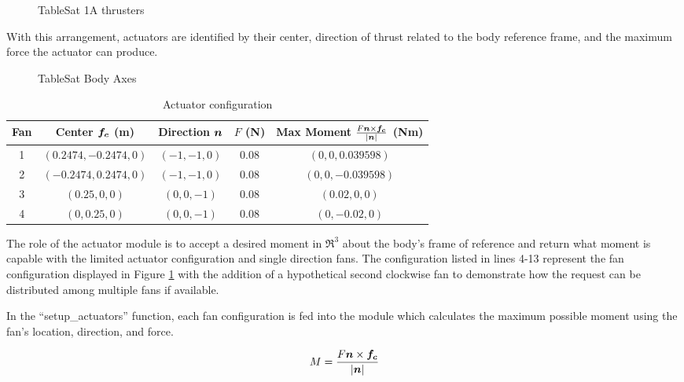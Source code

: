 \begin{figure}[H]
  \centerline{}
  \caption{TableSat 1A thrusters}
  \label{fig:TSatThrusters}
\end{figure}

With this arrangement, actuators are identified by their center, direction of thrust related to the body reference frame, and the maximum force the actuator can produce.

\begin{figure}[H]
  \centerline{}
  \caption{TableSat Body Axes}
  \label{fig:TableSatBodyAxes}
\end{figure}

\begin{table}[H]
  \centering
  \begin{tabular}{c|c|c|c|c}
    Fan & Center $\boldsymbol{f_c}$ (m) & Direction $\boldsymbol{n}$ & $F$ (N) & Max Moment $\frac{F \boldsymbol{n} \times \boldsymbol{f_c}}{|\boldsymbol{n}|}$ (Nm) \\ \hline
    1 & $(0.2474, -0.2474, 0)$ & $(-1, -1, 0)$ & 0.08 & $(0, 0, 0.039598)$ \\
    2 & $(-0.2474, 0.2474, 0)$ & $(-1, -1, 0)$ & 0.08 & $(0, 0, -0.039598)$ \\
    3 & $(0.25, 0, 0)$ & $(0, 0, -1)$ & 0.08 & $(0.02, 0, 0)$ \\
    4 & $(0, 0.25, 0)$ & $(0, 0, -1)$ & 0.08 & $(0, -0.02, 0)$ \\
  \end{tabular}
  \caption{Actuator configuration}
  \label{tbl:ActuatorConfiguration}
\end{table}


The role of the actuator module is to accept a desired moment in $\Re^3$ about the body's frame of reference and return what moment is capable with the limited actuator configuration and single direction fans.  The configuration listed in lines 4-13 represent the fan configuration displayed in Figure \ref{fig:TSatThrusters} with the addition of a hypothetical second clockwise fan to demonstrate how the request can be distributed among multiple fans if available.

In the ``setup\_actuators'' function, each fan configuration is fed into the module which calculates the maximum possible moment using the fan's location, direction, and force.

\begin{equation}
  M = \frac{F \boldsymbol{n} \times \boldsymbol{f_c}}{|\boldsymbol{n}|}
\end{equation}

